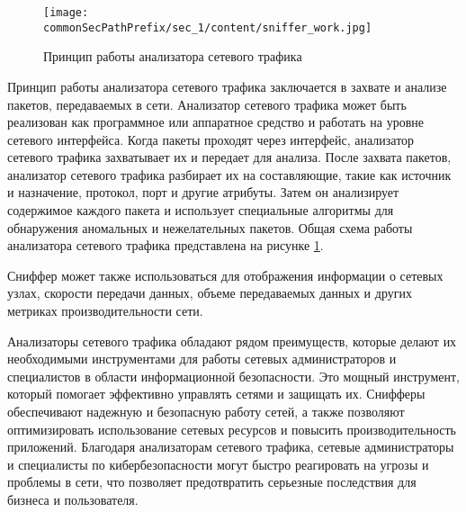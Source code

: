 \begin{figure}[h!]
    \centering
    \texttt{[image: \\commonSecPathPrefix/sec\_1/content/sniffer\_work.jpg]}
    \caption{Принцип работы анализатора сетевого трафика}
    \label{fig:snifwork}
\end{figure}



Принцип работы анализатора сетевого трафика заключается в захвате и
анализе пакетов, передаваемых в сети. Анализатор сетевого трафика может быть
реализован как программное или аппаратное средство и работать на уровне
сетевого интерфейса. Когда пакеты проходят через интерфейс, анализатор
сетевого трафика захватывает их и передает для анализа. После захвата пакетов,
анализатор сетевого трафика разбирает их на составляющие, такие как источник
и назначение, протокол, порт и другие атрибуты. Затем он анализирует
содержимое каждого пакета и использует специальные алгоритмы для
обнаружения аномальных и нежелательных пакетов. Общая схема работы
анализатора сетевого трафика представлена на рисунке \ref{fig:snifwork}.


Сниффер может также использоваться для отображения информации о
сетевых узлах, скорости передачи данных, объеме передаваемых данных и
других метриках производительности сети.


Анализаторы сетевого трафика обладают рядом преимуществ, которые
делают их необходимыми инструментами для работы сетевых администраторов
и специалистов в области информационной безопасности. Это мощный
инструмент, который помогает эффективно управлять сетями и защищать их.
Снифферы обеспечивают надежную и безопасную работу сетей, а также
позволяют оптимизировать использование сетевых ресурсов и повысить
производительность приложений. Благодаря анализаторам сетевого трафика,
сетевые администраторы и специалисты по кибербезопасности могут быстро
реагировать на угрозы и проблемы в сети, что позволяет предотвратить
серьезные последствия для бизнеса и пользователя.

